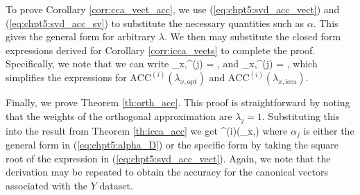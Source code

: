 To prove Corollary \ref{corr:cca_vect_acc}, we use (\ref{eq:chpt5:svd_acc_vect}) and
(\ref{eq:chpt5:svd_acc_sv}) to substitute the necessary quantities such as $\alpha$. This gives
the general form for arbitrary $\lambda$. We then may substitute the closed form
expressions derived for Corollary \ref{corr:icca_vects} to complete the
proof. Specifically, we note that we can write 
\be
\lambda_{x,}^{(j)} = , 
\ee
and
\be
\lambda_{x,}^{(j)} = , 
\ee
which simplifies the expressions for $\text{ACC}^{(i)}(\lambda_{x,\text{opt}})$ and
$\text{ACC}^{(i)}(\lambda_{x,\text{icca}})$. 

Finally, we prove Theorem \ref{th:orth_acc}. This proof is straightforward by noting that
the weights of the orthogonal approximation are $\lambda_j=1$. Substituting this into the
result from Theorem \ref{th:icca_acc} we get 
\be
{}^{(i)}(\lambda_{x,})\convas
{}
\ee
where
$\alpha_j$ is either the general form in (\ref{eq:chpt5:alpha_D}) or the specific form by taking
the square root of the expression in (\ref{eq:chpt5:svd_acc_vect}). Again, we note that the
derivation may be repeated to obtain the accuracy for the canonical vectors associated
with the $Y$ dataset. 
